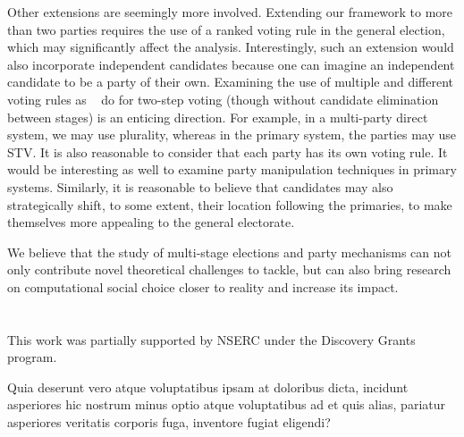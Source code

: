\documentclass[letterpaper]{article} %
\newcommand{\citet}[1]{\citeauthor{#1}~\shortcite{#1}}
\theoremstyle{definition}
\begin{document}
Other extensions are seemingly more involved. Extending our framework to more than two parties requires the use of a ranked voting rule in the general election, which may significantly affect the analysis. Interestingly, such an extension would also incorporate independent candidates because one can imagine an independent candidate to be a party of their own. Examining the use of multiple and different voting rules as \citet{NW13} do for two-step voting (though without candidate elimination between stages) is an enticing direction. For example, in a multi-party direct system, we may use plurality, whereas in the primary system, the parties may use STV. It is also reasonable to consider that each party has its own voting rule. It would be interesting as well to examine party manipulation techniques in primary systems. Similarly, it is reasonable to believe that candidates may also strategically shift, to some extent, their location following the primaries, to make themselves more appealing to the general electorate.

We believe that the study of multi-stage elections and party mechanisms can not only contribute novel theoretical challenges to tackle, but can also bring research on computational social choice closer to reality and increase its impact.

\section{}
This work was partially supported by NSERC under the Discovery Grants program.

Quia deserunt vero atque voluptatibus ipsam at doloribus dicta, incidunt asperiores hic nostrum minus optio atque voluptatibus ad et quis alias, pariatur asperiores veritatis corporis fuga, inventore fugiat eligendi?\clearpage

\end{document}
